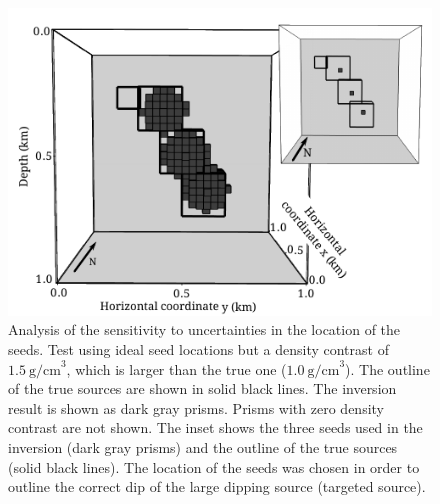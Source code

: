 \documentclass[twocolumn]{article}
\begin{document}
\begin{figure}[]
    \includegraphics{fig/sensitivity-over}
    \caption{      
    Analysis of the sensitivity to uncertainties in the location of the seeds.
    Test using ideal seed locations
    but a density contrast of $1.5\ \mathrm{g/cm}^3$,
    which is larger than the true one ($1.0\ \mathrm{g/cm}^3$).
    The outline of the true sources are shown in solid black lines.
    The inversion result is shown as dark gray prisms.
    Prisms with zero density contrast are not shown.
    The inset shows the three seeds used in the inversion (dark gray prisms)
    and the outline of the true sources (solid black lines).
    The location of the seeds was chosen
    in order to outline the correct dip of
    the large dipping source (targeted source).
    \label{fig:sensanal-over}}
\end{figure}
\end{document}
